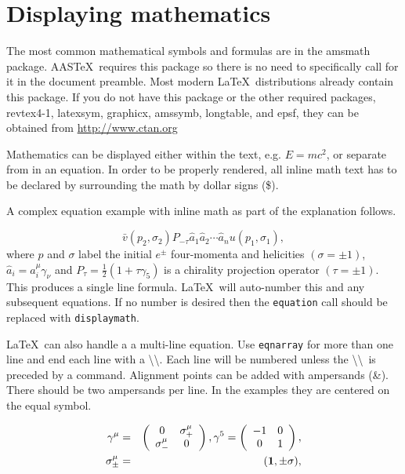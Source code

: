 \documentclass[preprint2]{aastex63}
\newcommand\aastex{AAS\TeX}
\newcommand\latex{La\TeX}
\begin{document}

\section{Displaying mathematics} \label{sec:displaymath}

The most common mathematical symbols and formulas are in the amsmath
package.  \aastex\ requires this package so there is no need to
specifically call for it in the document preamble.  Most modern \latex\
distributions already contain this package.  If you do not have this
package or the other required packages, revtex4-1, latexsym, graphicx,
amssymb, longtable, and epsf, they can be obtained from 
\url{http://www.ctan.org}

Mathematics can be displayed either within the text, e.g. $E = mc^2$, or
separate from in an equation.  In order to be properly rendered, all inline
math text has to be declared by surrounding the math by dollar signs (\$).

A complex equation example with inline math as part of the explanation
follows.

\begin{equation}
\bar v(p_2,\sigma_2)P_{-\tau}\hat a_1\hat a_2\cdots
\hat a_nu(p_1,\sigma_1) ,
\end{equation}
where $p$ and $\sigma$ label the initial $e^{\pm}$ four-momenta
and helicities $(\sigma = \pm 1)$, $\hat a_i=a^\mu_i\gamma_\nu$
and $P_\tau=\frac{1}{2}(1+\tau\gamma_5)$ is a chirality projection
operator $(\tau = \pm1)$.  This produces a single line formula.  \latex\ will
auto-number this and any subsequent equations.  If no number is desired then
the {\tt\string equation} call should be replaced with {\tt\string displaymath}.

\latex\ can also handle a a multi-line equation.  Use {\tt\string eqnarray}
for more than one line and end each line with a
\textbackslash\textbackslash.  Each line will be numbered unless the
\textbackslash\textbackslash\ is preceded by a {\tt\string\nonumber}
command.  Alignment points can be added with ampersands (\&).  There should be
two ampersands per line. In the examples they are centered on the equal
symbol.

\begin{eqnarray}
\gamma^\mu  & = &
 \left(
\begin{array}{cc}
0 & \sigma^\mu_+ \\
\sigma^\mu_- & 0
\end{array}     \right) ,
 \gamma^5= \left(
\begin{array}{cc}
-1 &   0\\
0 &   1
\end{array}     \right)  , \\
\sigma^\mu_{\pm}  & = &   ({\bf 1} ,\pm \sigma) , 
\end{eqnarray}
\end{document}
